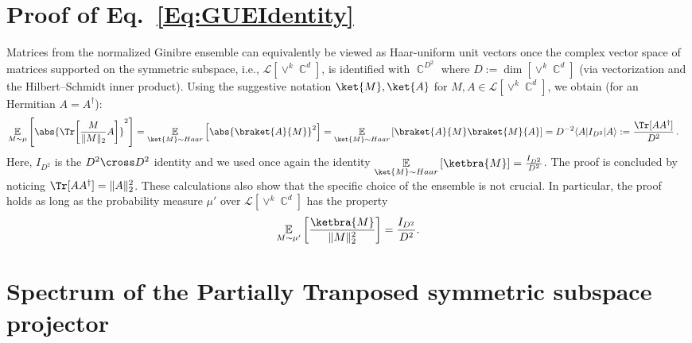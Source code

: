 \documentclass[aps,twocolumn,pra,superscriptaddress,nofootinbib]{revtex4-2}
\DeclareMathOperator{\C}{\mathbb{C}} %
\begin{document}
\section{Proof of Eq.~\eqref{Eq:GUEIdentity}} \label{Sec:Eq(18)proof}
Matrices from the normalized Ginibre ensemble can equivalently be viewed as Haar-uniform unit vectors once the complex vector space of matrices supported on the symmetric subspace, i.e.,
$\mathcal{L}[\vee^{k}\C^{d}]$, is identified with $\C^{D^2}$ where {$D:=\dim[\vee^{k}\C^{d}]$} (via vectorization and the Hilbert--Schmidt inner product). Using the suggestive notation $\ket{M},\ket{A}$ for $M,A\in \mathcal{L}[\vee^{k}\C^{d}]$, we obtain (for an Hermitian $A=A^\dagger$):
\begin{align}
    & \underset{M\sim \mu}{\mathbb{E}}
  \left[
    \abs{\Tr\!\left[\frac{M}{\lVert M\rVert_{2}}A\right]}^{2}
  \right]= \underset{\ket{M}\sim Haar}{\mathbb{E}}
  \left[
    \abs{\braket{A}{M}}^{2}
  \right]= \underset{\ket{M}\sim Haar}{\mathbb{E}}
  \left[\braket{A}{M}\braket{M}{A}
  \right]={D^{-2}}\langle A| {I_{D^2}}|A\rangle := \frac{\Tr[AA^{\dagger}]}{{D^2}} \,.
\end{align}
Here, $I_{{D^2}}$ is the ${D^2\cross D^2}$ identity and we used once again the identity $\underset{\ket{M}\sim Haar}{\mathbb{E}}
  \left[ \ketbra{M} \right]=\frac{I_{{D^2}}}{{D^2}}$.
The proof is concluded by noticing $\Tr[AA^{\dagger}]=\lVert A \rVert_{2}^{2}$.
These calculations also show that the specific choice of the ensemble is not crucial. In particular, the proof holds as long as the probability measure $\mu'$ over $\mathcal{L}[\vee^{k}\C^{d}]$ has the property
\[
\underset{M\sim \mu'}{\mathbb{E}}
\left[ \frac{\ketbra{M}}{\lVert M\rVert_{2}^{{2}}} \right]=\frac{I_{{D^2}}}{{D^2}}.
\]

\section{Spectrum of the Partially Tranposed symmetric subspace projector} \label{app:spectrum}
\end{document}
